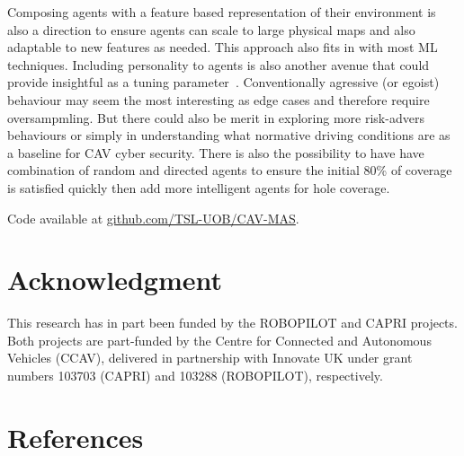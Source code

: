 \documentclass[letterpaper, 10 pt, journal, twoside]{IEEEtran}
\begin{document}
Composing agents with a feature based representation of their environment is also a direction to ensure agents can scale to large physical maps and also adaptable to new features as needed. This approach also fits in with most ML techniques.
%
Including personality to agents is also another avenue that could provide insightful as a tuning parameter~\cite{Zoumpoulaki2010}. Conventionally agressive (or egoist) behaviour may seem the most interesting as edge cases and therefore require oversampmling. But there could also be merit in exploring more risk-advers behaviours or simply in understanding what normative driving conditions are as a baseline for CAV cyber security. 
%
There is also the possibility to have have combination of random and directed agents to ensure the initial 80\% of coverage is satisfied quickly then add more intelligent agents for hole coverage.

Code %
available at \url{github.com/TSL-UOB/CAV-MAS}.


\section*{Acknowledgment}
This research has in part been funded by the ROBOPILOT and CAPRI projects. Both
projects are part-funded by the Centre for Connected and Autonomous
Vehicles (CCAV), delivered in partnership with Innovate UK under grant numbers
103703 (CAPRI) and 103288 (ROBOPILOT), respectively.


\balance
\section*{References}
\printbibliography[heading=none]
\end{document}
